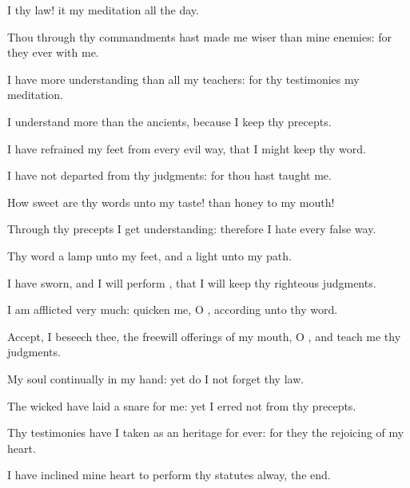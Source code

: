 {I thy
law! it
{} my
meditation all the
day.
\par }{\BB \par }{\Q {}Thou through thy
commandments hast made me
wiser than mine
enemies: for they
{}
ever with me.
\par }{\Q {}I have more
understanding than all my
teachers: for thy
testimonies
{} my
meditation.
\par }{\Q {}I
understand more than the
ancients, because I
keep thy
precepts.
\par }{\Q {}I have
refrained my
feet from every
evil
way, that I might
keep thy
word.
\par }{\Q {}I have not
departed from thy
judgments: for thou hast
taught me.
\par }{\BB \par }{\Q {}How
sweet are thy
words unto my
taste!
{} than
honey to my
mouth!
\par }{\Q {}Through thy
precepts I get
understanding: therefore I
hate every
false
way.
\par }{
\par }{\Q {}Thy
word
{} a
lamp unto my
feet, and a
light unto my
path.
\par }{\Q {}I have
sworn, and I will
perform
{}, that I will
keep thy
righteous
judgments.
\par }{\Q {}I am
afflicted very
much:
quicken me, O
{}, according unto thy
word.
\par }{\Q {}Accept, I beseech thee, the freewill
offerings of my
mouth, O
{}, and
teach me thy
judgments.
\par }{\BB \par }{\Q {}My
soul
{}
continually in my
hand: yet do I not
forget thy
law.
\par }{\Q {}The
wicked have
laid a
snare for me: yet I
erred not from thy
precepts.
\par }{\BB \par }{\Q {}Thy
testimonies have I taken as an
heritage for
ever: for they
{} the
rejoicing of my
heart.
\par }{\Q {}I have
inclined mine
heart to
perform thy
statutes
alway,
{} the
end.
}
